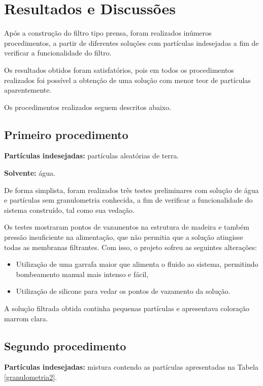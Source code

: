\chapter{Resultados e Discussões}
\label{chap:resultados}

Após a construção do filtro tipo prensa, foram realizados inúmeros
procedimentos, a partir de diferentes soluções com partículas indesejadas a fim
de verificar a funcionalidade do filtro.

Os resultados obtidos foram satisfatórios, pois em todos os procedimentos
realizados foi possível a obtenção de uma solução com menor teor de partículas
aparentemente.

Os procedimentos realizados seguem descritos abaixo.

\section{Primeiro procedimento}
\label{sec:proc1}

\textbf{Partículas indesejadas:} partículas aleatórias de terra.

\textbf{Solvente:} água.

De forma simplista, foram realizados três testes preliminares com solução de
água e partículas sem granulometria conhecida, a fim de verificar a
funcionalidade do sistema construído, tal como sua vedação.

Os testes mostraram pontos de vazamentos na estrutura de madeira e também
pressão insuficiente na alimentação, que não permitia que a solução atingisse
todas as membranas filtrantes. Com isso, o projeto sofreu as seguintes
alterações:

\begin{itemize}
\item Utilização de uma garrafa maior que alimenta o fluido ao sistema,
  permitindo bombeamento manual mais intenso e fácil,
\item Utilização de silicone para vedar os pontos de vazamento da solução.
\end{itemize}

A solução filtrada obtida continha pequenas partículas e apresentava coloração
marrom clara.


\section{Segundo procedimento}
\label{sec:proc2}

\textbf{Partículas indesejadas:} mistura contendo as partículas apresentadas na Tabela
\ref{granulometria2}.

